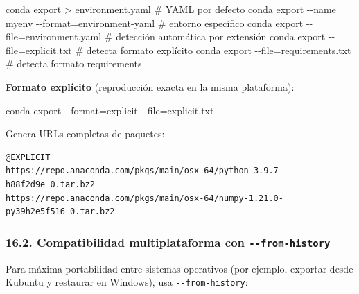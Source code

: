 \documentclass[
  doc,
  floatsintext,
  longtable,
  a4paper,
  nolmodern,
  notxfonts,
  notimes,
  12pt,
  colorlinks=true,linkcolor=blue,citecolor=blue,urlcolor=blue]{apa7}
\newenvironment{Shaded}{\begin{snugshade}}{\end{snugshade}}
\newcommand{\AttributeTok}[1]{\textcolor[rgb]{0.40,0.45,0.13}{#1}}
\newcommand{\CommentTok}[1]{\textcolor[rgb]{0.37,0.37,0.37}{#1}}
\newcommand{\ExtensionTok}[1]{\textcolor[rgb]{0.00,0.23,0.31}{#1}}
\newcommand{\NormalTok}[1]{\textcolor[rgb]{0.00,0.23,0.31}{#1}}
\newcommand{\OperatorTok}[1]{\textcolor[rgb]{0.37,0.37,0.37}{#1}}
\begin{document}
\begin{Shaded}
\begin{Highlighting}[]
\ExtensionTok{conda}\NormalTok{ export }\OperatorTok{\textgreater{}}\NormalTok{ environment.yaml                          }\CommentTok{\# YAML por defecto}
\ExtensionTok{conda}\NormalTok{ export }\AttributeTok{{-}{-}name}\NormalTok{ myenv }\AttributeTok{{-}{-}format}\OperatorTok{=}\NormalTok{environment{-}yaml       }\CommentTok{\# entorno específico}
\ExtensionTok{conda}\NormalTok{ export }\AttributeTok{{-}{-}file}\OperatorTok{=}\NormalTok{environment.yaml                      }\CommentTok{\# detección automática por extensión}
\ExtensionTok{conda}\NormalTok{ export }\AttributeTok{{-}{-}file}\OperatorTok{=}\NormalTok{explicit.txt                          }\CommentTok{\# detecta formato explícito}
\ExtensionTok{conda}\NormalTok{ export }\AttributeTok{{-}{-}file}\OperatorTok{=}\NormalTok{requirements.txt                       }\CommentTok{\# detecta formato requirements}
\end{Highlighting}
\end{Shaded}

\textbf{Formato explícito} (reproducción exacta en la misma plataforma):

\begin{Shaded}
\begin{Highlighting}[]
\ExtensionTok{conda}\NormalTok{ export }\AttributeTok{{-}{-}format}\OperatorTok{=}\NormalTok{explicit }\AttributeTok{{-}{-}file}\OperatorTok{=}\NormalTok{explicit.txt}
\end{Highlighting}
\end{Shaded}

Genera URLs completas de paquetes:

\begin{verbatim}
@EXPLICIT
https://repo.anaconda.com/pkgs/main/osx-64/python-3.9.7-h88f2d9e_0.tar.bz2
https://repo.anaconda.com/pkgs/main/osx-64/numpy-1.21.0-py39h2e5f516_0.tar.bz2
\end{verbatim}

\subsubsection{\texorpdfstring{16.2. Compatibilidad multiplataforma con
\texttt{-\/-from-history}}{16.2. Compatibilidad multiplataforma con -\/-from-history}}\label{compatibilidad-multiplataforma-con---from-history}

Para máxima portabilidad entre sistemas operativos (por ejemplo,
exportar desde Kubuntu y restaurar en Windows), usa
\texttt{-\/-from-history}:
\end{document}
